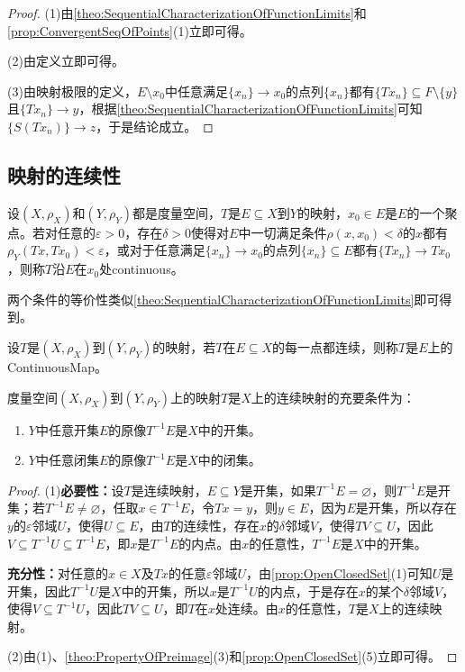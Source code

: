 \begin{proof}
	(1)由\cref{theo:SequentialCharacterizationOfFunctionLimits}和\cref{prop:ConvergentSeqOfPoints}(1)立即可得。\par
	(2)由定义立即可得。\par
	(3)由映射极限的定义，$E\setminus x_0$中任意满足$\{x_n\}\to x_0$的点列$\{x_n\}$都有$\{Tx_n\}\subseteq F\setminus\{y\}$且$\{Tx_n\}\to y$，根据\cref{theo:SequentialCharacterizationOfFunctionLimits}可知$\{S(Tx_n)\}\to z$，于是结论成立。
\end{proof}
\subsection{映射的连续性}
\begin{definition}
	设$(X,\rho_X)$和$(Y,\rho_Y)$都是度量空间，$T$是$E\subseteq X$到$Y$的映射，$x_0\in E$是$E$的一个聚点。若对任意的$\varepsilon>0$，存在$\delta>0$使得对$E$中一切满足条件$\rho(x,x_0)<\delta$的$x$都有$\rho_Y(Tx,Tx_0)<\varepsilon$，或对于任意满足$\{x_n\}\to x_0$的点列$\{x_n\}\subseteq E$都有$\{Tx_n\}\to Tx_0$，则称$T$沿$E$在$x_0$处\gls{continuous}。
\end{definition}
两个条件的等价性类似\cref{theo:SequentialCharacterizationOfFunctionLimits}即可得到。
\begin{definition}
	设$T$是$(X,\rho_X)$到$(Y,\rho_Y)$的映射，若$T$在$E\subseteq X$的每一点都连续，则称$T$是$E$上的\gls{ContinuousMap}。
\end{definition}
\begin{theorem}\label{theo:ContinousMapO2OC2C}
	度量空间$(X,\rho_X)$到$(Y,\rho_Y)$上的映射$T$是$X$上的连续映射的充要条件为：
	\begin{enumerate}
		\item $Y$中任意开集$E$的原像$T^{-1}E$是$X$中的开集。
		\item $Y$中任意闭集$E$的原像$T^{-1}E$是$X$中的闭集。
	\end{enumerate}
\end{theorem}
\begin{proof}
	(1)\textbf{必要性：}设$T$是连续映射，$E\subseteq Y$是开集，如果$T^{-1}E=\varnothing$，则$T^{-1}E$是开集；若$T^{-1}E\ne\varnothing$，任取$x\in T^{-1}E$，令$Tx=y$，则$y\in E$，因为$E$是开集，所以存在$y$的$\varepsilon$邻域$U$，使得$U\subseteq E$，由$T$的连续性，存在$x$的$\delta$邻域$V$，使得$TV\subseteq U$，因此$V\subseteq T^{-1}U\subseteq T^{-1}E$，即$x$是$T^{-1}E$的内点。由$x$的任意性，$T^{-1}E$是$X$中的开集。\par
	\textbf{充分性：}对任意的$x\in X$及$Tx$的任意$\varepsilon$邻域$U$，由\cref{prop:OpenClosedSet}(1)可知$U$是开集，因此$T^{-1}U$是$X$中的开集，所以$x$是$T^{-1}U$的内点，于是存在$x$的某个$\delta$邻域$V$，使得$V\subseteq T^{-1}U$，因此$TV\subseteq U$，即$T$在$x$处连续。由$x$的任意性，$T$是$X$上的连续映射。\par
	(2)由(1)、\cref{theo:PropertyOfPreimage}(3)和\cref{prop:OpenClosedSet}(5)立即可得。
\end{proof}
